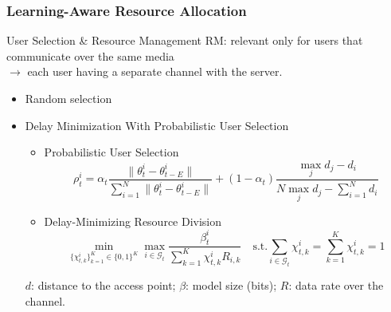 
\begin{frame}
\frametitle{Learning-Aware Resource Allocation}

\begin{block}{User Selection \& {\color{red} Resource Management}}
{\smaller
{\color{red}\noindent RM: relevant only for users that communicate over the same media \\
$\to$ each user having a separate channel with the server.
}
}
\begin{itemize}
\item Random selection
\item Delay Minimization With Probabilistic User Selection
  \begin{itemize}
      \item Probabilistic User Selection
      \vspace{-0.5em}
      {\smaller
      $$\rho_t^i = \alpha_t \dfrac{\lVert \theta_t^i - \theta_{t-E}^i \rVert}{\sum\limits_{i=1}^N \lVert \theta_t^i - \theta_{t-E}^i \rVert} + (1-\alpha_t)\dfrac{\max_j d_j - d_i}{N\max_j d_j - \sum\limits_{i=1}^N d_i}$$
      }
      \vspace{-0.7em}
      \item Delay-Minimizing Resource Division
      \vspace{-1em}
      {\smaller
        $$
        \min_{\{\chi_{t,k}^i\}_{k=1}^K \in \{0, 1\}^K} \max_{i\in\mathcal{G}_t} \dfrac{\beta_t^i}{\sum\limits_{k=1}^K \chi_{t,k}^i R_{i,k}} \quad
        \text{s.t.} \sum\limits_{i\in\mathcal{G}_t} \chi_{t,k}^i = \sum\limits_{k=1}^K \chi_{t,k}^i = 1
        $$
        }
  \end{itemize}
  \vspace{-0.7em}
  {\smaller \color{red}
  $d$: distance to the access point; $\beta$: model size (bits); $R$: data rate over the channel.
  }
\end{itemize}
\end{block}

\end{frame}


